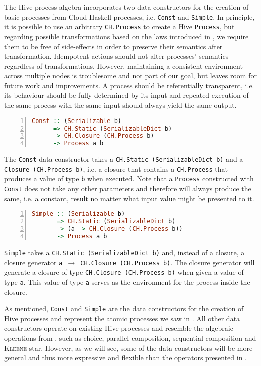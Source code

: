 The Hive process algebra incorporates two data constructors for the creation of basic processes from Cloud Haskell processes, i.e. \texttt{Const} and \texttt{Simple}. In principle, it is possible to use an arbitrary \texttt{CH.Process} to create a Hive \texttt{Process}, but regarding possible transformations based on the laws introduced in , we require them to be free of side-effects in order to preserve their semantics after transformation. Idempotent actions should not alter processes' semantics regardless of transformations. However, maintaining a consistent environment across multiple nodes is troublesome and not part of our goal, but leaves room for future work and improvements. A process should be referentially transparent, i.e. its behaviour should be fully determined by its input and repeated execution of the same process with the same input should always yield the same output.
\begin{lstlisting}[language=Haskell,caption=Signature of the \texttt{Const} type constructor.,numbers=left,frame=bt]
Const :: (Serializable b) 
      => CH.Static (SerializableDict b)
      -> CH.Closure (CH.Process b)
      -> Process a b
\end{lstlisting}
The \texttt{Const} data constructor takes a \texttt{CH.Static (SerializableDict b)} and a \texttt{Closure (CH.Process b)}, i.e. a closure that contains a \texttt{CH.Process} that produces a value of type \texttt{b} when executed. Note that a \texttt{Process} constructed with \texttt{Const} does not take any other parameters and therefore will always produce the same, i.e. a constant, result no matter what input value might be presented to it. 

\begin{lstlisting}[language=Haskell,caption=Signature of the \texttt{Simple} type constructor.,numbers=left,frame=bt]
Simple :: (Serializable b) 
       => CH.Static (SerializableDict b)
       -> (a -> CH.Closure (CH.Process b))
       -> Process a b
\end{lstlisting}
\texttt{Simple} takes a \texttt{CH.Static (SerializableDict b)} and, instead of a closure, a closure generator \texttt{a $\to$ CH.Closure (CH.Process b)}. The closure generator will generate a closure of type \texttt{CH.Closure (CH.Process b)} when given a value of type \texttt{a}. This value of type \texttt{a} serves as the environment for the process inside the closure.

As mentioned, \texttt{Const} and \texttt{Simple} are the data constructors for the creation of Hive processes and represent the atomic processes we saw in . All other data constructors operate on existing Hive processes and resemble the algebraic operations from , such as choice, parallel composition, sequential composition and \textsc{Kleene} star. However, as we will see, some of the data constructors will be more general and thus more expressive and flexible than the operators presented in .

